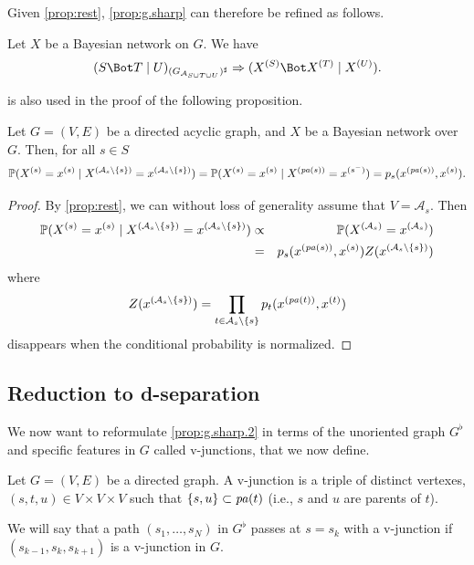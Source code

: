 Given  \cref{prop:rest},  \cref{prop:g.sharp} can
therefore be refined as follows.
\begin{proposition}
\label{prop:g.sharp.2}
Let $X$ be a Bayesian network on $G$. We have
$$
\cind{S}{T}{U}_{(G_{\CA_{S\cup T\cup U}})^\sharp}\Ria \cind{\pe XS}{\pe XT}{\pe XU}.
$$
\end{proposition}

  is also used in the proof of the following
proposition.
\begin{proposition}
\label{prop:bayes.net.cond}
Let $G = (V,E)$ be a directed acyclic graph, and $X$ be a Bayesian
network over $G$. Then, for all $s\in S$
\[
\bm{\mathbb P}(X^{(s)} = x^{(s)} \mid X^{(\mathcal A_s\setminus \{s\})} = x^{(\mathcal A_s\setminus \{s\})}) = \bm{\mathbb P}(X^{(s)} = x^{(s)} \mid X^{({\mathit{pa}(s)})} = x^{(s^{-})}) = p_s(x^{({\mathit{pa}(s)})}, x^{(s)}).
\]
\end{proposition}
\begin{proof} 
By  \cref{prop:rest}, we can without loss of generality
assume that $V = \mathcal A_s$. Then
\begin{eqnarray*}
\bm{\mathbb P}(X^{(s)} = x^{(s)} \mid X^{(\mathcal A_s\setminus \{s\})} = x^{(\mathcal A_s\setminus
  \{s\})}) &\propto & \bm{\mathbb P}(X^{(\mathcal A_s)} = x^{(\mathcal A_s)})\\
&=& p_s(x^{({\mathit{pa}(s)})}, x^{(s)}) Z(x^{(\mathcal A_s\setminus
  \{s\})})
\end{eqnarray*}
where
\[
Z(x^{(\mathcal A_s\setminus
  \{s\})}) = \prod_{t\in \mathcal A_s\setminus\{s\}} p_t(x^{({\mathit{pa}(t)})}, x^{(t)})
\]
disappears when the conditional probability is normalized.
\end{proof}

\subsection{Reduction to d-separation}
We now want to reformulate 
\cref{prop:g.sharp.2} in terms of the unoriented graph $G^\flat$ and
specific features in $G$ called v-junctions, that we now define.
\begin{definition}
\label{def:v.j}
Let $G=(V,E)$ be a directed graph. A v-junction is a triple of
distinct vertexes,
$(s,t,u)\in V\times V \times V$ such that $\left\{ s,u \right\}\subset {\mathit{pa}(t)}$
(i.e., $s$ and $u$ are parents of $t$). 
   
We will say that a path $(s_1, \ldots, s_N)$ in $G^\flat$ passes at $s=s_k$ with a
v-junction if $(s_{k-1}, s_k, s_{k+1})$ is a v-junction in $G$.
\end{definition}


